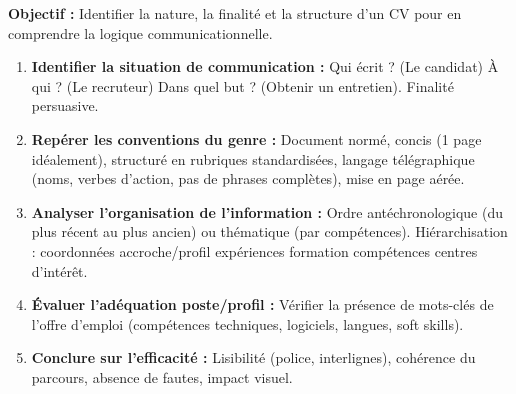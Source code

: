 \documentclass[11pt]{article}
\newcommand{\cle}[1]{{\popxbold\color{popdark}#1}}
\begin{document}
\begin{methode}
\textbf{Objectif :} Identifier la nature, la finalité et la structure d'un CV pour en comprendre la logique communicationnelle.
\begin{enumerate}
    \item \textbf{Identifier la situation de communication :} Qui écrit ? (Le candidat) À qui ? (Le recruteur) Dans quel but ? (Obtenir un entretien). \cle{Finalité persuasive}.
    \item \textbf{Repérer les conventions du genre :} Document normé, concis (1 page idéalement), structuré en rubriques standardisées, langage télégraphique (noms, verbes d'action, pas de phrases complètes), mise en page aérée.
    \item \textbf{Analyser l'organisation de l'information :} Ordre antéchronologique (du plus récent au plus ancien) ou thématique (par compétences). Hiérarchisation : coordonnées \rightarrow accroche/profil \rightarrow expériences \rightarrow formation \rightarrow compétences \rightarrow centres d'intérêt.
    \item \textbf{Évaluer l'adéquation poste/profil :} Vérifier la présence de \cle{mots-clés} de l'offre d'emploi (compétences techniques, logiciels, langues, soft skills).
    \item \textbf{Conclure sur l'efficacité :} Lisibilité (police, interlignes), cohérence du parcours, absence de fautes, impact visuel.
\end{enumerate}
\end{methode}
\end{document}
